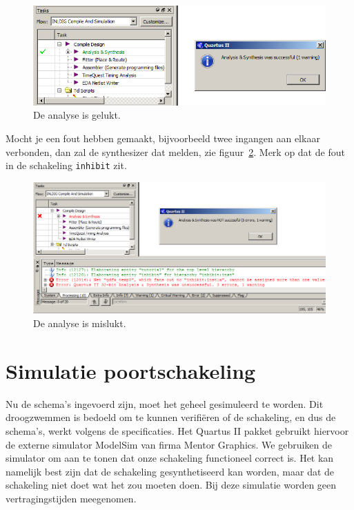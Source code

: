\documentclass[a4paper,12pt,fleqn,twoside]{book}
\def\tutpicscale{0.455}
\newcommand{\naam}[1]{\texttt{#1}}
\begin{document}
\begin{figure}[H]
\centering
\includegraphics[scale=\tutpicscale]{040analysissynthesissuccessful}
\caption{De analyse is gelukt.}
\label{fig:040analysissynthesissuccessful}
\end{figure}

Mocht je een fout hebben gemaakt, bijvoorbeeld twee ingangen aan elkaar
verbonden, dan zal de synthesizer dat melden, zie
figuur~\ref{fig:041notsuccesful}.
Merk op dat de fout in de schakeling \naam{inhibit} zit.

\begin{figure}[H]
\centering
\includegraphics[scale=\tutpicscale]{041notsuccesful}
\caption{De analyse is mislukt.}
\label{fig:041notsuccesful}
\end{figure}

\section{Simulatie poortschakeling}
\label{sec:simulatiepoortschakeling}
Nu de schema's ingevoerd zijn, moet het geheel gesimuleerd te worden. Dit
droogzwemmen is bedoeld om te kunnen verifi\"{e}ren of de schakeling, en dus
de schema's, werkt volgens de specificaties. Het Quartus II pakket gebruikt
hiervoor de externe simulator ModelSim van firma Mentor Graphics. We gebruiken
de simulator om aan te tonen dat onze schakeling functioneel correct is. Het
kan namelijk best zijn dat de schakeling gesynthetiseerd kan worden, maar dat
de schakeling niet doet wat het zou moeten doen. Bij deze simulatie worden
geen vertragingstijden meegenomen.
 
\end{document}
